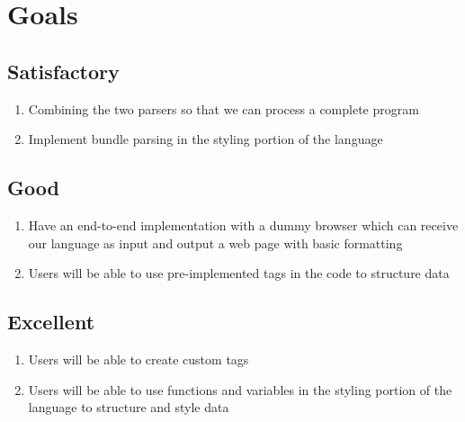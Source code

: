 \documentclass{article}
\begin{document}
\section*{Goals}

\subsection*{Satisfactory}
\begin{enumerate}
	\item Combining the two parsers so that we can process a complete program
	\item Implement bundle parsing in the styling portion of the language
\end{enumerate}

\subsection*{Good}
\begin{enumerate}
	\item Have an end-to-end implementation with a dummy browser which can receive
		our language as input and output a web page with basic formatting
	\item Users will be able to use pre-implemented tags in the code to structure
		data
\end{enumerate}

\subsection*{Excellent}
\begin{enumerate}
	\item Users will be able to create custom tags
	\item Users will be able to use functions and variables 
		in the styling portion of the language to structure and
		style data
\end{enumerate}
\end{document}
